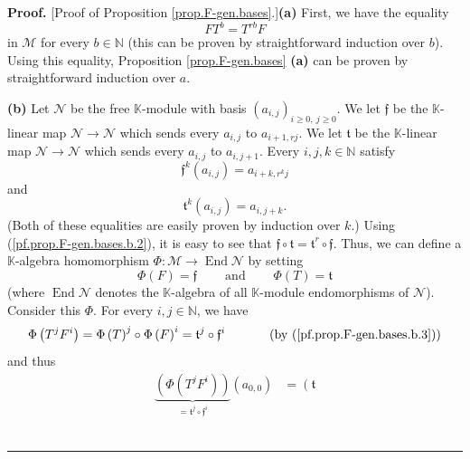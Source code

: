 \documentclass[numbers=enddot,12pt,final,onecolumn,notitlepage]{scrartcl}%
\theoremstyle{definition}
\newenvironment{proof}[1][Proof]{\noindent\textbf{#1.} }{\ \rule{0.5em}{0.5em}}
\begin{document}
\begin{proof}
[Proof of Proposition \ref{prop.F-gen.bases}.]\textbf{(a)} First, we have the
equality
\begin{equation}
FT^{b}=T^{rb}F \label{pf.prop.F-gen.bases.a.1}%
\end{equation}
in $\mathcal{M}$ for every $b\in\mathbb{N}$ (this can be proven by
straightforward induction over $b$). Using this equality, Proposition
\ref{prop.F-gen.bases} \textbf{(a)} can be proven by straightforward induction
over $a$. \medskip

\textbf{(b)} Let $\mathcal{N}$ be the free $\mathbb{K}$-module with basis
$\left(  a_{i,j}\right)  _{i\geq0,\ j\geq0}$. We let $\mathfrak{f}$ be the
$\mathbb{K}$-linear map $\mathcal{N}\rightarrow\mathcal{N}$ which sends every
$a_{i,j}$ to $a_{i+1,rj}$. We let $\mathfrak{t}$ be the $\mathbb{K}$-linear
map $\mathcal{N}\rightarrow\mathcal{N}$ which sends every $a_{i,j}$ to
$a_{i,j+1}$. Every $i,j,k\in\mathbb{N}$ satisfy%
\begin{equation}
\mathfrak{f}^{k}\left(  a_{i,j}\right)  =a_{i+k,r^{k}j}
\label{pf.prop.F-gen.bases.b.1}%
\end{equation}
and
\begin{equation}
\mathfrak{t}^{k}\left(  a_{i,j}\right)  =a_{i,j+k}.
\label{pf.prop.F-gen.bases.b.2}%
\end{equation}
(Both of these equalities are easily proven by induction over $k$.) Using
(\ref{pf.prop.F-gen.bases.b.2}), it is easy to see that $\mathfrak{f}%
\circ\mathfrak{t}=\mathfrak{t}^{r}\circ\mathfrak{f}$. Thus, we can define a
$\mathbb{K}$-algebra homomorphism $\Phi:\mathcal{M}\rightarrow
\operatorname*{End}\mathcal{N}$ by setting%
\begin{equation}
\Phi\left(  F\right)  =\mathfrak{f}\ \ \ \ \ \ \ \ \ \ \text{and}%
\ \ \ \ \ \ \ \ \ \ \Phi\left(  T\right)  =\mathfrak{t}
\label{pf.prop.F-gen.bases.b.3}%
\end{equation}
(where $\operatorname*{End}\mathcal{N}$ denotes the $\mathbb{K}$-algebra of
all $\mathbb{K}$-module endomorphisms of $\mathcal{N}$). Consider this $\Phi$.
For every $i,j\in\mathbb{N}$, we have%
\[
\Phi\left(  T^{j}F^{i}\right)  =\Phi\left(  T\right)  ^{j}\circ\Phi\left(
F\right)  ^{i}=\mathfrak{t}^{j}\circ\mathfrak{f}^{i}%
\ \ \ \ \ \ \ \ \ \ \left(  \text{by (\ref{pf.prop.F-gen.bases.b.3})}\right)
\]
and thus%
\begin{align}
\underbrace{\left(  \Phi\left(  T^{j}F^{i}\right)  \right)  }_{=\mathfrak{t}%
^{j}\circ\mathfrak{f}^{i}}\left(  a_{0,0}\right)   &  =\left(  \mathfrak{t}%

\end{align}
\end{proof}
\end{document}
